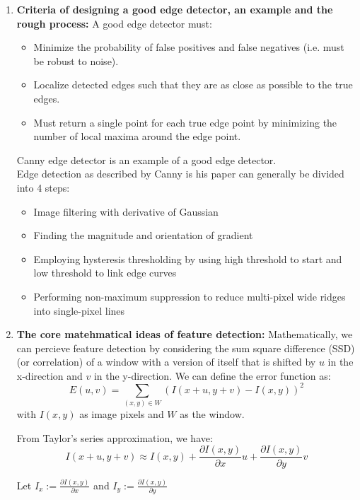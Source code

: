 \documentclass[a4paper]{article}
\begin{document}
\begin{enumerate}
        \item \textbf{Criteria of designing a good edge detector, an example and the rough process:} 
        A good edge detector must:
        \begin{itemize}
                \item Minimize the probability  of false positives and false negatives (i.e. must be robust to noise).
                \item Localize detected edges such that they are as close as possible to the true edges.
                \item Must return a single point for each true edge point by minimizing the number of local maxima around the edge point.
        \end{itemize}

        Canny edge detector is an example of a good edge detector.\\

        Edge detection as described by Canny is his paper \cite{canny86} can generally be divided into 4 steps:
        \begin{itemize}
                \item Image filtering with derivative of Gaussian
                \item Finding the magnitude and orientation of gradient
                \item Employing hysteresis thresholding by using high threshold to start and low threshold to link edge curves
                \item Performing non-maximum suppression to reduce multi-pixel wide ridges into single-pixel lines
        \end{itemize}

        \item \textbf{The core matehmatical ideas of feature detection:}
        Mathematically, we can percieve feature detection by considering the sum square difference (SSD) (or correlation) of a window with a version of itself that is shifted by $u$ in the x-direction and $v$ in the y-direction. 
        We can define the error function as: 
        $$ E(u,v)= \sum_{(x,y) \in W}{\left(I(x+u, y+v) - I(x,y)\right)}^{2}  $$
        with $I(x,y)$ as image pixels and $W$ as the window.

        From Taylor's series approximation, we have:
        $$ I(x+u, y+v) \approx I(x, y) +  \frac{\partial I(x, y)}{\partial x} u + \frac{\partial I(x, y)}{\partial y} v $$

        Let $I_{x}:= \frac{\partial I(x, y)}{\partial x}$ and $I_{y}:= \frac{\partial I(x, y)}{\partial y}$


\end{enumerate}
\end{document}
